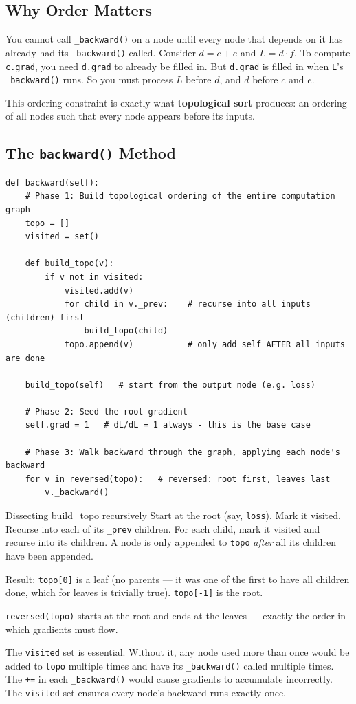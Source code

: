 \documentclass[12pt,a4paper]{article}
\newcommand{\code}[1]{\texttt{\small\color{deepblue}#1}}
\begin{document}
\subsection{Why Order Matters}

You cannot call \code{\_backward()} on a node until every node that depends on it has already had its \code{\_backward()} called. Consider $d = c + e$ and $L = d \cdot f$. To compute \code{c.grad}, you need \code{d.grad} to already be filled in. But \code{d.grad} is filled in when \code{L}'s \code{\_backward()} runs. So you must process $L$ before $d$, and $d$ before $c$ and $e$.

This ordering constraint is exactly what \textbf{topological sort} produces: an ordering of all nodes such that every node appears before its inputs.

\subsection{The \texttt{backward()} Method}

\begin{lstlisting}
def backward(self):
    # Phase 1: Build topological ordering of the entire computation graph
    topo = []
    visited = set()

    def build_topo(v):
        if v not in visited:
            visited.add(v)
            for child in v._prev:    # recurse into all inputs (children) first
                build_topo(child)
            topo.append(v)           # only add self AFTER all inputs are done

    build_topo(self)   # start from the output node (e.g. loss)

    # Phase 2: Seed the root gradient
    self.grad = 1   # dL/dL = 1 always - this is the base case

    # Phase 3: Walk backward through the graph, applying each node's backward
    for v in reversed(topo):   # reversed: root first, leaves last
        v._backward()
\end{lstlisting}

\begin{codeexplainbox}{Dissecting build\_topo recursively}
Start at the root (say, \code{loss}). Mark it visited. Recurse into each of its \code{\_prev} children. For each child, mark it visited and recurse into its children. A node is only appended to \code{topo} \emph{after} all its children have been appended.

Result: \code{topo[0]} is a leaf (no parents — it was one of the first to have all children done, which for leaves is trivially true). \code{topo[-1]} is the root.

\code{reversed(topo)} starts at the root and ends at the leaves — exactly the order in which gradients must flow.

The \code{visited} set is essential. Without it, any node used more than once would be added to \code{topo} multiple times and have its \code{\_backward()} called multiple times. The \code{+=} in each \code{\_backward()} would cause gradients to accumulate incorrectly. The \code{visited} set ensures every node's backward runs exactly once.
\end{codeexplainbox}
\end{document}
